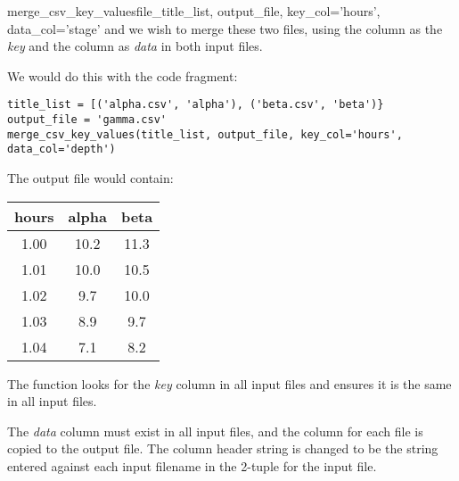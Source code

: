 \documentclass{manual}
\begin{document}
\begin{methoddesc}{merge_csv_key_values}{file_title_list,
                                         output_file,
                                         key_col='hours',
                                         data_col='stage'}
and we wish to merge these two files, using the  column as the \emph{key} and
the  column as \emph{data} in both input files.

We would do this with the code fragment:

\begin{verbatim}
title_list = [('alpha.csv', 'alpha'), ('beta.csv', 'beta')}
output_file = 'gamma.csv'
merge_csv_key_values(title_list, output_file, key_col='hours', data_col='depth')
\end{verbatim}

The output file  would contain:

\begin{table}[htp]
  \begin{center}
    \begin{tabular}{|ccc|}
      \hline
      hours & alpha & beta \\
      \hline
      1.00 & 10.2 & 11.3 \\
      1.01 & 10.0 & 10.5 \\
      1.02 &  9.7 & 10.0 \\
      1.03 &  8.9 &  9.7 \\
      1.04 &  7.1 &  8.2 \\
      \hline
    \end{tabular}
  \end{center}
\end{table}

The function looks for the \emph{key} column in all input files and ensures it is the same in all input files.

The \emph{data} column must exist in all input files, and the column for each file is copied to the 
output file.  The column header string is changed to be the string entered against each input filename 
in the  2-tuple for the input file.
\end{methoddesc}
\end{document}
